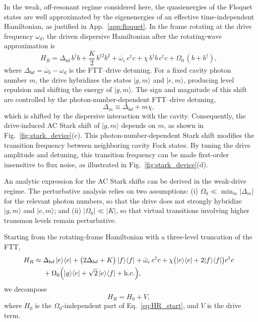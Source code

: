 In the weak, off-resonant regime considered here, the quasienergies of the Floquet states are well approximated by the eigenenergies of an effective time-independent Hamiltonian, as justified in App.~\ref{app:floquet}. In the frame rotating at the drive frequency \(\omega_d\), the driven dispersive Hamiltonian after the rotating-wave approximation is
\begin{equation}
\label{eq:H_R_floquet}
H_R =
\Delta_{bd}\, b^\dagger b
+ \frac{K}{2}\, b^{\dagger 2} b^{2}
+ \overline{\omega}_c\, c^\dagger c
+ \chi\, b^\dagger b\, c^\dagger c
+ \Omega_0\, ( b + b^\dagger ),
\end{equation}
where \(\Delta_{bd}=\bar{\omega}_b-\omega_d\) is the FTT--drive detuning. For a fixed cavity photon number \(m\), the drive hybridizes the states \(|g,m\rangle\) and \(|e,m\rangle\), producing level repulsion and shifting the energy of \(|g,m\rangle\). The sign and magnitude of this shift are controlled by the photon-number-dependent FTT--drive detuning,
\[
\Delta_m \equiv \Delta_{bd}+m\chi ,
\]
which is shifted by the dispersive interaction with the cavity. Consequently, the drive-induced AC Stark shift of \(|g,m\rangle\) depends on \(m\), as shown in Fig.~\ref{fig:stark_device}(c). This photon-number-dependent Stark shift modifies the transition frequency between neighboring cavity Fock states. By tuning the drive amplitude and detuning, this transition frequency can be made first-order insensitive to flux noise, as illustrated in Fig.~\ref{fig:stark_device}(d).

An analytic expression for the AC Stark shifts can be derived in the weak-drive regime. The perturbative analysis relies on two assumptions: (i) \(\Omega_0 \ll \min_m |\Delta_m|\) for the relevant photon numbers, so that the drive does not strongly hybridize \(|g,m\rangle\) and \(|e,m\rangle\); and (ii) \(|\Omega_0| \ll |K|\), so that virtual transitions involving higher transmon levels remain perturbative.

Starting from the rotating-frame Hamiltonian with a three-level truncation of the FTT,
\begin{equation}
\label{eq:HR_start}
\begin{aligned}
H_R \approx\;&
\Delta_{bd}\,|e\rangle\langle e|
+\bigl(2\Delta_{bd} + K\bigr)\,|f\rangle\langle f|
+\bar\omega_c\,c^\dagger c
+\chi\bigl(|e\rangle\langle e|+2|f\rangle\langle f|\bigr)c^\dagger c \\
&+\Omega_0\Bigl(|g\rangle\langle e|+
\sqrt{2}\,|e\rangle\langle f|+
\mathrm{h.c.}\Bigr),
\end{aligned}
\end{equation}
we decompose
\begin{equation}
\label{eq:H0_plus_V}
H_R = H_0 + V,
\end{equation}
where \(H_0\) is the \(\Omega_0\)-independent part of Eq.~\eqref{eq:HR_start}, and \(V\) is the drive term.

